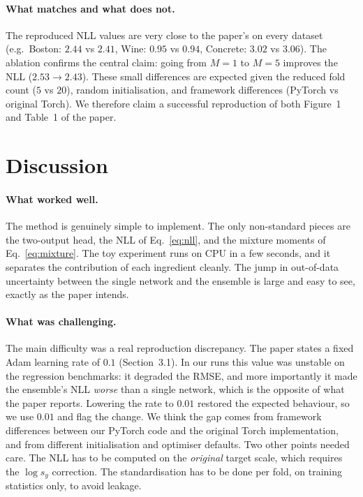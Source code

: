 \documentclass{article}
\begin{document}
\paragraph{What matches and what does not.}
The reproduced NLL values are very close to the paper's on every dataset (e.g.\
Boston: $2.44$ vs $2.41$, Wine: $0.95$ vs $0.94$, Concrete: $3.02$ vs $3.06$).
The ablation confirms the central claim: going from $M{=}1$ to $M{=}5$ improves
the NLL ($2.53\!\rightarrow\!2.43$). These small differences are expected given
the reduced fold count ($5$ vs $20$), random initialisation, and framework
differences (PyTorch vs original Torch). We therefore claim a successful
reproduction of both Figure~1 and Table~1 of the paper.

\section{Discussion}
\label{sec:discussion}

\paragraph{What worked well.}
The method is genuinely simple to implement. The only non-standard pieces are
the two-output head, the NLL of Eq.~\eqref{eq:nll}, and the mixture moments of
Eq.~\eqref{eq:mixture}. The toy experiment runs on CPU in a few seconds, and it
separates the contribution of each ingredient cleanly. The jump in out-of-data
uncertainty between the single network and the ensemble is large and easy to
see, exactly as the paper intends.

\paragraph{What was challenging.}
The main difficulty was a real reproduction discrepancy. The paper states a
fixed Adam learning rate of $0.1$ (Section~3.1). In our runs this value was
unstable on the regression benchmarks: it degraded the RMSE, and more
importantly it made the ensemble's NLL \emph{worse} than a single network, which
is the opposite of what the paper reports. Lowering the rate to $0.01$ restored
the expected behaviour, so we use $0.01$ and flag the change. We think the gap
comes from framework differences between our PyTorch code and the original Torch
implementation, and from different initialisation and optimiser defaults. Two
other points needed care. The NLL has to be computed on the \emph{original}
target scale, which requires the $\log s_y$ correction. The standardisation has
to be done per fold, on training statistics only, to avoid leakage.
\end{document}

